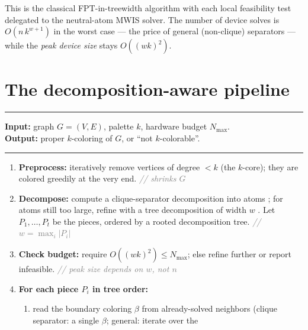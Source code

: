 \documentclass[11pt]{article}
\theoremstyle{definition}
\theoremstyle{remark}
\newcommand{\Comment}[1]{\hfill\textit{\footnotesize\textcolor{gray}{// #1}}}
\begin{document}
\noindent This is the classical FPT-in-treewidth algorithm with each local
feasibility test delegated to the neutral-atom MWIS solver. The number of device
solves is $O(n\,k^{w+1})$ in the worst case --- the price of general (non-clique)
separators --- while the \emph{peak device size} stays $O((wk)^2)$.

\section{The decomposition-aware pipeline}
\label{sec:pipeline}

\begin{algorithm}[h]
\caption{Decomposition-aware coloring-to-neutral-atom compiler}
\label{alg:dec}
\rule{\linewidth}{0.4pt}\vspace{-2pt}
\begin{flushleft}
\textbf{Input:} graph $G=(V,E)$, palette $k$, hardware budget $N_{\max}$.\\
\textbf{Output:} proper $k$-coloring of $G$, or ``not $k$-colorable''.
\end{flushleft}
\vspace{-4pt}\rule{\linewidth}{0.4pt}
\begin{enumerate}[leftmargin=2.4em,itemsep=1pt,label=\arabic*.]
\item \textbf{Preprocess:} iteratively remove vertices of degree $<k$ (the
      $k$-core); they are colored greedily at the very end. \Comment{shrinks $G$}
\item \textbf{Decompose:} compute a clique-separator decomposition into atoms
      \cite{Tarjan1985}; for atoms still too large, refine with a tree
      decomposition of width $w$ \cite{Bodlaender1996}. Let $P_1,\dots,P_t$ be the
      pieces, ordered by a rooted decomposition tree. \Comment{$w=\max_i|P_i|$}
\item \textbf{Check budget:} require $O((wk)^2)\le N_{\max}$; else refine further
      or report infeasible. \Comment{peak size depends on $w$, not $n$}
\item \textbf{For each piece $P_i$ in tree order:}
      \begin{enumerate}[leftmargin=1.6em,label=(\alph*),itemsep=0pt]
        \item read the boundary coloring $\beta$ from already-solved neighbors
              (clique separator: a single $\beta$; general: iterate over the

\end{enumerate}
\end{enumerate}
\end{algorithm}
\end{document}

